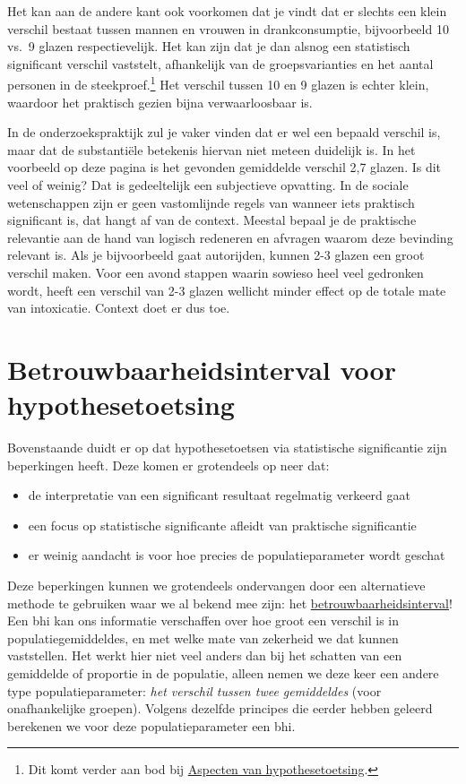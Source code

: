 \documentclass[
  letterpaper,
  DIV=11,
  numbers=noendperiod]{scrreprt}
\providecommand{\tightlist}{%
  \setlength{\itemsep}{0pt}\setlength{\parskip}{0pt}}
\begin{document}
Het kan aan de andere kant ook voorkomen dat je vindt dat er slechts een
klein verschil bestaat tussen mannen en vrouwen in drankconsumptie,
bijvoorbeeld 10 vs.~9 glazen respectievelijk. Het kan zijn dat je dan
alsnog een statistisch significant verschil vaststelt, afhankelijk van
de groepsvarianties en het aantal personen in de steekproef.\footnote{Dit
  komt verder aan bod bij \href{004-02-aspectenhypo.qmd}{Aspecten van
  hypothesetoetsing}.} Het verschil tussen 10 en 9 glazen is echter
klein, waardoor het praktisch gezien bijna verwaarloosbaar is.

In de onderzoekspraktijk zul je vaker vinden dat er wel een bepaald
verschil is, maar dat de substantiële betekenis hiervan niet meteen
duidelijk is. In het voorbeeld op deze pagina is het gevonden gemiddelde
verschil 2,7 glazen. Is dit veel of weinig? Dat is gedeeltelijk een
subjectieve opvatting. In de sociale wetenschappen zijn er geen
vastomlijnde regels van wanneer iets praktisch significant is, dat hangt
af van de context. Meestal bepaal je de praktische relevantie aan de
hand van logisch redeneren en afvragen waarom deze bevinding relevant
is. Als je bijvoorbeeld gaat autorijden, kunnen 2-3 glazen een groot
verschil maken. Voor een avond stappen waarin sowieso heel veel
gedronken wordt, heeft een verschil van 2-3 glazen wellicht minder
effect op de totale mate van intoxicatie. Context doet er dus toe.

\section{Betrouwbaarheidsinterval voor
hypothesetoetsing}\label{betrouwbaarheidsinterval-voor-hypothesetoetsing}

Bovenstaande duidt er op dat hypothesetoetsen via statistische
significantie zijn beperkingen heeft. Deze komen er grotendeels op neer
dat:

\begin{itemize}
\tightlist
\item
  de interpretatie van een significant resultaat regelmatig verkeerd
  gaat
\item
  een focus op statistische significante afleidt van praktische
  significantie
\item
  er weinig aandacht is voor hoe precies de populatieparameter wordt
  geschat
\end{itemize}

Deze beperkingen kunnen we grotendeels ondervangen door een alternatieve
methode te gebruiken waar we al bekend mee zijn: het
\hyperref[betrouwbaarheidsinterval]{betrouwbaarheidsinterval}! Een bhi
kan ons informatie verschaffen over hoe groot een verschil is in
populatiegemiddeldes, en met welke mate van zekerheid we dat kunnen
vaststellen. Het werkt hier niet veel anders dan bij het schatten van
een gemiddelde of proportie in de populatie, alleen nemen we deze keer
een andere type populatieparameter: \emph{het verschil tussen twee
gemiddeldes} (voor onafhankelijke groepen). Volgens dezelfde principes
die eerder hebben geleerd berekenen we voor deze populatieparameter een
bhi.
\end{document}
